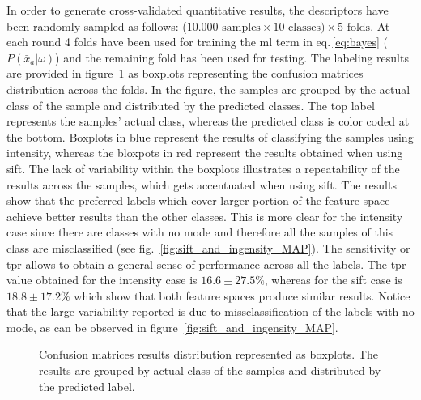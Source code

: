 \documentclass[a4paper, 10pt, conference]{llncs}      %
\begin{document}
In order to generate cross-validated quantitative results, the descriptors have been randomly sampled as follows: ($10.000\text{ samples} \times 10 \text{ classes}) \times 5 \text{ folds}$.
 At each round 4 folds have been used for training the \ac{ml} term in eq.\,\ref{eq:bayes} ($P(\bar{x}_a|\omega)$) and the remaining fold has been used for testing.
 The labeling results are provided in figure~\ref{fig:quantitativeComparison} as boxplots representing the confusion matrices distribution across the folds.
 In the figure, the samples are grouped by the actual class of the sample and distributed by the predicted classes. The top label represents the samples' actual class, whereas the predicted class is color coded at the bottom. Boxplots in blue represent the results of classifying the samples using intensity, whereas the bloxpots in red represent the results obtained when using \ac{sift}. The lack of variability within the boxplots illustrates a repeatability of the results across the samples, which gets accentuated when using \ac{sift}. The results show that the preferred labels which cover larger portion of the feature space achieve better results than the other classes. This is more clear for the intensity case since there are classes with no mode and therefore all the samples of this class are misclassified (see fig.~\ref{fig:sift_and_ingensity_MAP}). The sensitivity or \ac{tpr} allows to obtain a general sense of performance across all the labels. The \ac{tpr} value obtained for the intensity case is $16.6\pm27.5\%$, whereas for the \ac{sift} case is $18.8\pm17.2\%$ which show that both feature spaces produce similar results. Notice that the large variability reported is due to missclassification of the labels with no mode, as can be observed in figure~\ref{fig:sift_and_ingensity_MAP}.



\begin{figure}[Htbp]

 
\caption{Confusion matrices results distribution represented as boxplots. The results are grouped by actual class of the samples and distributed by the predicted label.}
\label{fig:quantitativeComparison}
\end{figure}
\end{document}
